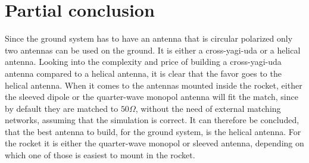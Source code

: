 \section{Partial conclusion}
Since the ground system has to have an antenna that is circular polarized only two antennas can be used on the ground. It is either a cross-yagi-uda or a helical antenna. Looking into the complexity and price  of building a cross-yagi-uda antenna compared to a helical antenna, it is clear that the favor goes to the helical antenna. When it comes to the antennas mounted inside the rocket, either the sleeved dipole or the quarter-wave monopol antenna will fit the match, since by default they are matched to $50\Omega$, without the need of external matching networks, assuming that the simulation is correct. It can therefore be concluded, that the best antenna to build, for the ground system, is the helical antenna. For the rocket it is either the quarter-wave monopol or sleeved antenna, depending on which one of those is easiest to mount in the rocket.  

